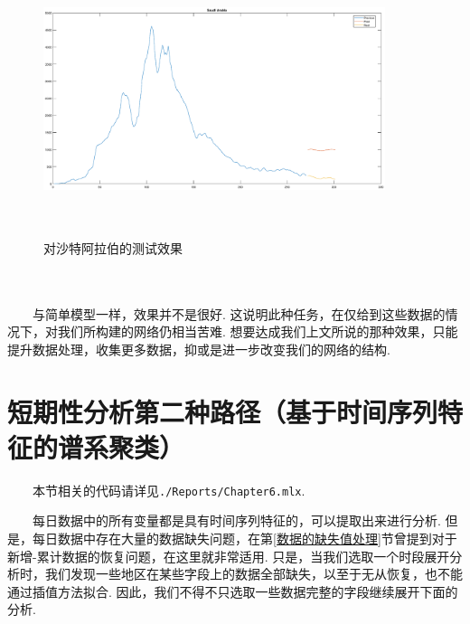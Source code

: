 \documentclass[a4paper, titlepage]{article}
\begin{document}
    \begin{minipage}{\textwidth}
        \begin{figure}[H]
            \centering
            \includegraphics[height=8cm, width=10cm]{./Chap4/Pred4.eps}
            \vspace{-1.5em}
            \caption{对沙特阿拉伯的测试效果}
    \end{figure}
    \end{minipage}\\\quad\\
	　　与简单模型一样，效果并不是很好. 这说明此种任务，在仅给到这些数据的情况下，对我们所构建的网络仍相当苦难. 想要达成我们上文所说的那种效果，只能提升数据处理，收集更多数据，抑或是进一步改变我们的网络的结构.

    \newpage
    \section{短期性分析第二种路径（基于时间序列特征的谱系聚类）}\label{第二种路径}
    　　本节相关的代码请详见\texttt{./Reports/Chapter6.mlx}.

    　　每日数据中的所有变量都是具有时间序列特征的，可以提取出来进行分析. 但是，每日数据中存在大量的数据缺失问题，在第\ref{数据的缺失值处理}节曾提到对于新增-累计数据的恢复问题，在这里就非常适用. 只是，当我们选取一个时段展开分析时，我们发现一些地区在某些字段上的数据全部缺失，以至于无从恢复，也不能通过插值方法拟合. 因此，我们不得不只选取一些数据完整的字段继续展开下面的分析.
\end{document}
